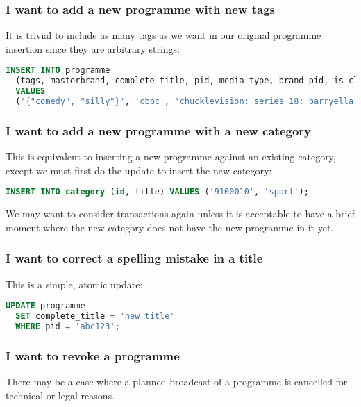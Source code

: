 \documentclass[11pt,a4paper]{article}
\begin{document}
\subsubsection{I want to add a new programme with new tags}

It is trivial to include as many tags as we want in our original programme
insertion since they are arbitrary strings:

\begin{lstlisting}[language=SQL]
  INSERT INTO programme
  (tags, masterbrand, complete_title, pid, media_type, brand_pid, is_clip)
  VALUES
  ('{"comedy", "silly"}', 'cbbc', 'chucklevision:_series_18:_barryella', 'b0079214', 'video', 'b006w487', '0');
\end{lstlisting}

\subsubsection{I want to add a new programme with a new category}

This is equivalent to inserting a new programme against an existing category,
except we must first do the update to insert the new category:

\begin{lstlisting}[language=SQL]
  INSERT INTO category (id, title) VALUES ('9100010', 'sport');
\end{lstlisting}

We may want to consider transactions again unless it is acceptable
to have a brief moment where the new category does not have the new
programme in it yet.

\subsubsection{I want to correct a spelling mistake in a title}

This is a simple, atomic update:

\begin{lstlisting}[language=SQL]
  UPDATE programme
  SET complete_title = 'new title'
  WHERE pid = 'abc123';
\end{lstlisting}

\subsubsection{I want to revoke a programme}

There may be a case where a planned broadcast of a programme is
cancelled for technical or legal reasons.
\end{document}
